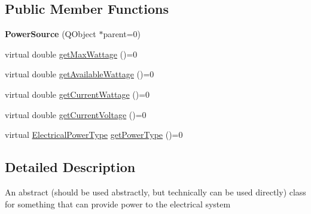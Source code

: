\subsection*{Public Member Functions}
\begin{DoxyCompactItemize}
\item 
\hypertarget{class_challenger604_systems_1_1_power_source_a928bccc7b0f2533f4de701926747d910}{{\bfseries Power\-Source} (Q\-Object $\ast$parent=0)}\label{class_challenger604_systems_1_1_power_source_a928bccc7b0f2533f4de701926747d910}

\item 
virtual double \hyperlink{class_challenger604_systems_1_1_power_source_aed53a668295c22fabdf8adf8018d8d1d}{get\-Max\-Wattage} ()=0
\item 
virtual double \hyperlink{class_challenger604_systems_1_1_power_source_a35af892773c7a60f4d6ac031755cd104}{get\-Available\-Wattage} ()=0
\item 
virtual double \hyperlink{class_challenger604_systems_1_1_power_source_a82252be3f4e80239848bd9cadb69ec31}{get\-Current\-Wattage} ()=0
\item 
virtual double \hyperlink{class_challenger604_systems_1_1_power_source_af432be401da09206f49439f6c5299176}{get\-Current\-Voltage} ()=0
\item 
virtual \hyperlink{namespace_challenger604_systems_a9ad1a793d94b97514092692cb7315afd}{Electrical\-Power\-Type} \hyperlink{class_challenger604_systems_1_1_power_source_a5d42cde201e448ba9fb59991ad31b454}{get\-Power\-Type} ()=0
\end{DoxyCompactItemize}


\subsection{Detailed Description}
An abstract (should be used abstractly, but technically can be used directly) class for something that can provide power to the electrical system 

